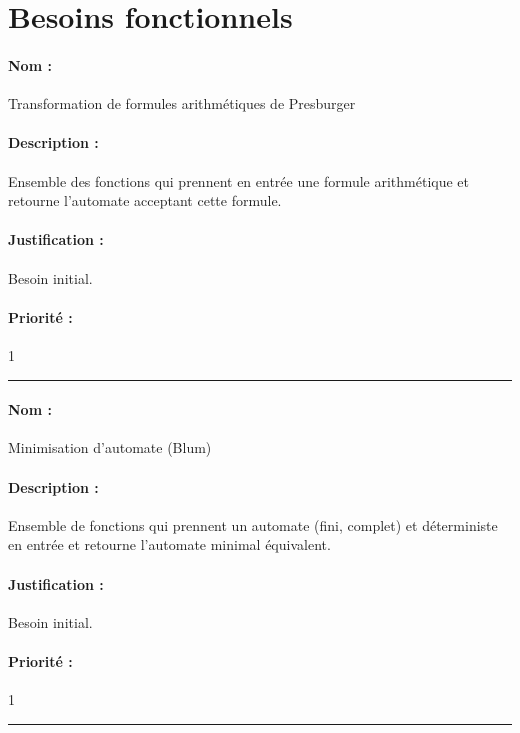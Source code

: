 \documentclass{article}%
\begin{document}
\section{Besoins fonctionnels}

\paragraph{Nom :} Transformation de formules arithmétiques de Presburger

\paragraph{Description :} Ensemble des fonctions qui prennent en entrée une formule arithmétique et retourne l'automate acceptant cette formule.

\paragraph{Justification :} Besoin initial.

\paragraph{Priorité :} 1\\

\rule{\linewidth}{1pt}

\paragraph{Nom :} Minimisation d'automate (Blum)

\paragraph{Description :} Ensemble de fonctions qui prennent un automate (fini, complet) et déterministe en entrée et retourne l'automate minimal équivalent.

\paragraph{Justification :} Besoin initial.

\paragraph{Priorité :} 1\\

\rule{\linewidth}{1pt}
\end{document}
